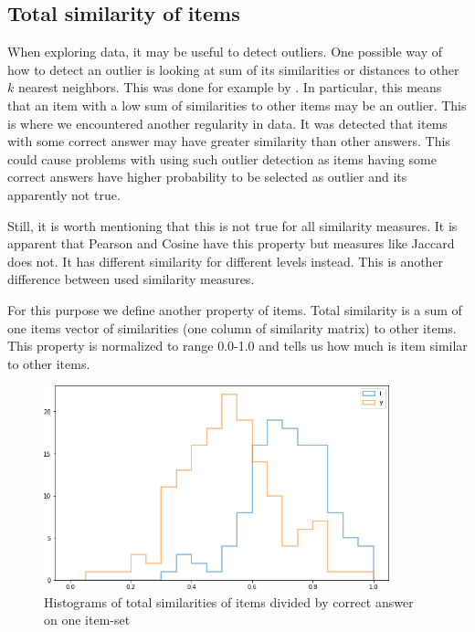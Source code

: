 \documentclass[
  digital, %
  table,   %
  nolof,     %
  nolot,     %
  nocover,
  color
]{fithesis3}
\begin{document}

\subsection{Total similarity of items}\label{total-similarity-of-items}

When exploring data, it may be useful to detect outliers. One possible way of how to detect an outlier is looking at sum of its similarities or distances to other $k$ nearest neighbors. This was done for example by \citeauthor{mitchell2014survey}\cite{mitchell2014survey}. In particular, this means that an item with a low sum of similarities to other items may be an outlier. This is where we encountered another regularity in data. It was detected that items with some correct answer may have greater similarity than other answers. This could cause problems with using such outlier detection as items having some correct answers have higher probability to be selected as outlier and its apparently not true.

Still, it is worth mentioning that this is not true for all similarity measures. It is apparent that Pearson and Cosine have this property but measures like Jaccard does not. It has different similarity for different levels instead. This is another difference between used similarity measures.

For this purpose we define another property of items. Total similarity is a sum of one items vector of similarities (one column of similarity matrix) to other items. This property is normalized to range 0.0-1.0 and tells us how much is item similar to other items.

\begin{figure}
  \includegraphics[width=10cm]{img/histogram_i_y}
  \caption{Histograms of total similarities of items divided by correct answer on one item-set}
  \label{fig:histogram_i_y}
\end{figure}
\end{document}
